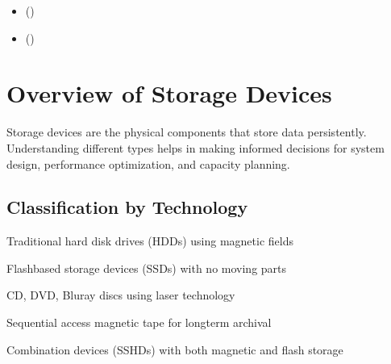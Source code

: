 \documentclass[letterpaper,10pt,english]{sphinxmanual}
\begin{document}
\begin{sphinxcontents}
\begin{itemize}
\item {} 
\sphinxAtStartPar
{}\label{\detokenize{storage-devices:id29}}{\hyperref[\detokenize{storage-devices:best-practices}]{}} ()

\item {} 
\sphinxAtStartPar
{}\label{\detokenize{storage-devices:id30}}{\hyperref[\detokenize{storage-devices:see-also}]{}} ()

\end{itemize}
\end{sphinxcontents}


\section{Overview of Storage Devices}
\label{\detokenize{storage-devices:overview-of-storage-devices}}
\sphinxAtStartPar
Storage devices are the physical components that store data persistently. Understanding different types helps in making informed decisions for system design, performance optimization, and capacity planning.


\subsection{Classification by Technology}
\label{\detokenize{storage-devices:classification-by-technology}}\begin{description}
\sphinxAtStartPar
Traditional hard disk drives (HDDs) using magnetic fields

\sphinxAtStartPar
Flash\sphinxhyphen{}based storage devices (SSDs) with no moving parts

\sphinxAtStartPar
CD, DVD, Blu\sphinxhyphen{}ray discs using laser technology

\sphinxAtStartPar
Sequential access magnetic tape for long\sphinxhyphen{}term archival

\sphinxAtStartPar
Combination devices (SSHDs) with both magnetic and flash storage

\end{description}
\end{document}
